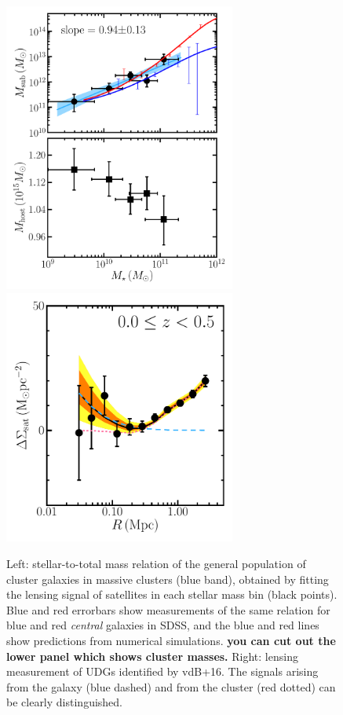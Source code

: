 \documentclass[12pt]{article}
\begin{document}
\begin{figure}
 \centerline{\includegraphics[width=3in]{mass_mstar.pdf}
             \includegraphics[width=3in]{esd.pdf}}
\caption{\small Left: stellar-to-total mass relation of the general population of cluster galaxies in massive clusters (blue band), obtained by fitting the lensing signal of satellites in each stellar mass bin (black points). Blue and red errorbars show measurements of the same relation for blue and red \emph{central} galaxies in SDSS, and the blue and red lines show predictions from numerical simulations. {\bf you can cut out the lower panel which shows cluster masses.} Right: lensing measurement of UDGs identified by vdB+16. The signals arising from the galaxy (blue dashed) and from the cluster (red dotted) can be clearly distinguished.}
\end{figure}
\end{document}
